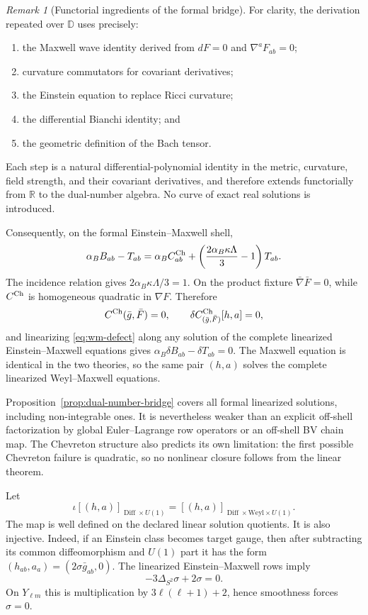 \documentclass[11pt]{article}
\theoremstyle{remark}
\newtheorem{remark}[theorem]{Remark}
\newcommand{\Diff}{\operatorname{Diff}}
\begin{document}
\begin{remark}[Functorial ingredients of the formal bridge]
For clarity, the derivation repeated over $\mathbb D$ uses precisely:
\begin{enumerate}
\item the Maxwell wave identity derived from $dF=0$ and
$\nabla^aF_{ab}=0$;
\item curvature commutators for covariant derivatives;
\item the Einstein equation to replace Ricci curvature;
\item the differential Bianchi identity; and
\item the geometric definition of the Bach tensor.
\end{enumerate}
Each step is a natural differential-polynomial identity in the metric,
curvature, field strength, and their covariant derivatives, and therefore
extends functorially from $\mathbb R$ to the dual-number algebra. No curve of
exact real solutions is introduced.
\end{remark}

Consequently, on the formal Einstein--Maxwell shell,
\begin{equation}\label{eq:wm-defect}
 \alpha_BB_{ab}-T_{ab}
 =\alpha_B C^{\rm Ch}_{ab}
 +\left(\frac{2\alpha_B\kappa\Lambda}{3}-1\right)T_{ab}.
\end{equation}
The incidence relation gives $2\alpha_B\kappa\Lambda/3=1$. On the product
fixture $\bar\nabla\bar F=0$, while $C^{\rm Ch}$ is homogeneous quadratic in
$\nabla F$. Therefore
\begin{equation}
 C^{\rm Ch}(\bar g,\bar F)=0,\qquad
 \delta C^{\rm Ch}_{(\bar g,\bar F)}[h,a]=0,
\end{equation}
and linearizing \eqref{eq:wm-defect} along any solution of the complete
linearized Einstein--Maxwell equations gives
$\alpha_B\delta B_{ab}-\delta T_{ab}=0$. The Maxwell equation is identical
in the two theories, so the same pair $(h,a)$ solves the complete linearized
Weyl--Maxwell equations.

Proposition~\ref{prop:dual-number-bridge} covers all formal linearized
solutions, including non-integrable ones. It is nevertheless weaker than an
explicit off-shell factorization by global Euler--Lagrange row operators or
an off-shell BV chain map. The Chevreton structure also predicts its own
limitation: the first possible Chevreton failure is quadratic, so no
nonlinear closure follows from the linear theorem.

Let
\begin{equation}
 \iota[(h,a)]_{\Diff\times U(1)}
 =[(h,a)]_{\Diff\times\mathrm{Weyl}\times U(1)}.
\end{equation}
The map is well defined on the declared linear solution quotients. It is also
injective. Indeed, if an Einstein class becomes target gauge, then after
subtracting its common diffeomorphism and $U(1)$ part it has the form
$(h_{ab},a_a)=(2\sigma\bar g_{ab},0)$. The linearized Einstein--Maxwell rows
imply
\begin{equation}\label{eq:weyl-injectivity}
 -3\Delta_{S^2}\sigma+2\sigma=0.
\end{equation}
On $Y_{\ell m}$ this is multiplication by $3\ell(\ell+1)+2$, hence smoothness
forces $\sigma=0$.
\end{document}

